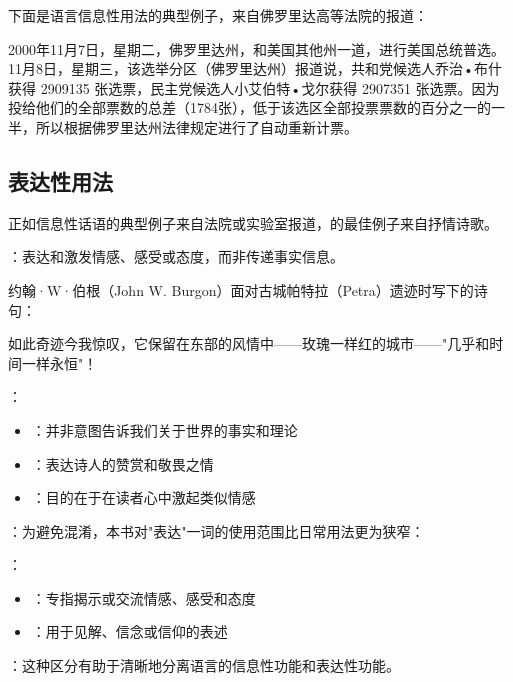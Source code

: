 下面是语言信息性用法的典型例子，来自佛罗里达高等法院的报道：

\begin{displayquote}
2000年11月7日，星期二，佛罗里达州，和美国其他州一道，进行美国总统普选。11月8日，星期三，该选举分区（佛罗里达州）报道说，共和党候选人乔治•布什获得 2909135 张选票，民主党候选人小艾伯特•戈尔获得 2907351 张选票。因为投给他们的全部票数的总差（1784张），低于该选区全部投票票数的百分之一的一半，所以根据佛罗里达州法律规定进行了自动重新计票。\cite{palmbeach2000}
\end{displayquote}

\subsection{表达性用法}

\begin{theorembox}[title=表达性功能的核心特征]
正如信息性话语的典型例子来自法院或实验室报道，的最佳例子来自抒情诗歌。

：表达和激发情感、感受或态度，而非传递事实信息。
\end{theorembox}

\begin{examplebox}[title=诗歌中的表达性用法]
约翰·W·伯根（John W. Burgon）面对古城帕特拉（Petra）遗迹时写下的诗句：

\begin{displayquote}
如此奇迹今我惊叹，它保留在东部的风情中——玫瑰一样红的城市——"几乎和时间一样永恒"！
\end{displayquote}

：
\begin{itemize}
  \item {}：并非意图告诉我们关于世界的事实和理论
  \item {}：表达诗人的赞赏和敬畏之情
  \item {}：目的在于在读者心中激起类似情感
\end{itemize}
\end{examplebox}

\begin{theorembox}[title="表达"概念的界定]
：为避免混淆，本书对"表达"一词的使用范围比日常用法更为狭窄：

：
\begin{itemize}
  \item {}：专指揭示或交流情感、感受和态度
  \item {}：用于见解、信念或信仰的表述
\end{itemize}

：这种区分有助于清晰地分离语言的信息性功能和表达性功能。
\end{theorembox}

